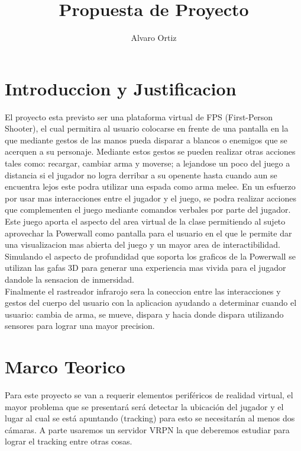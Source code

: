 \documentclass[11pt]{article} %
\title{Propuesta de Proyecto}
\author{Alvaro Ortiz}
\begin{document}
\maketitle

\section{Introduccion y Justificacion}
El proyecto esta previsto ser una plataforma virtual de FPS (First-Person Shooter), el cual permitira al usuario colocarse en frente de una pantalla en la que mediante gestos de las manos pueda disparar a blancos o enemigos que se acerquen a su personaje. Mediante estos gestos se pueden realizar otras acciones tales como: recargar, cambiar arma y moverse; a lejandose un poco del juego a distancia si el jugador no logra derribar a su openente hasta cuando aun se encuentra lejos este podra utilizar una espada como arma melee. En un esfuerzo por usar mas interacciones entre el jugador y el juego, se podra realizar acciones que complementen el juego mediante comandos verbales por parte del jugador.\\

Este juego aporta el aspecto del area virtual de la clase permitiendo al sujeto aprovechar la Powerwall como pantalla para el usuario en el que le permite dar una visualizacion mas abierta del juego y un mayor area de interactibilidad. Simulando el aspecto de profundidad que soporta los graficos de la Powerwall se utilizan las gafas 3D para generar una experiencia mas vivida para el jugador dandole la sensacion de inmersidad.\\

Finalmente el rastreador infrarojo sera la coneccion entre las interacciones y gestos del cuerpo del usuario con la aplicacion ayudando a determinar cuando el usuario: cambia de arma, se mueve, dispara y hacia donde dispara utilizando sensores para lograr una mayor precision.

\section{Marco Teorico}
Para este proyecto se van a requerir elementos periféricos de realidad virtual, el mayor problema que se presentará será detectar la ubicación del jugador y el lugar al cual se está apuntando (tracking) para esto se necesitarán al menos dos cámaras. A parte usaremos un servidor VRPN la que deberemos estudiar para  lograr el tracking entre otras cosas.
\end{document}
